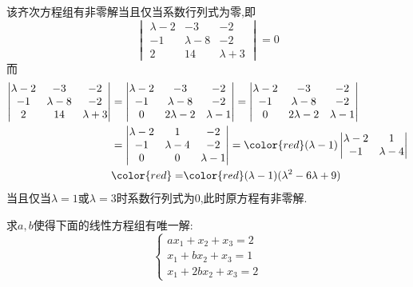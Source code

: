 \documentclass{ctexart}
\begin{document}
\begin{solution}
    该齐次方程组有非零解当且仅当系数行列式为零,即
    \[\begin{vmatrix}
        \lambda-2&-3&-2\\
        -1&\lambda-8&-2\\
        2&14&\lambda+3
    \end{vmatrix}=0\]
    而
    \[\begin{aligned}
        \begin{vmatrix}
            \lambda-2&-3&-2\\
            -1&\lambda-8&-2\\
            2&14&\lambda+3
        \end{vmatrix}
        &= \begin{vmatrix}
                \lambda-2&-3&-2\\
                -1&\lambda-8&-2\\
                0&2\lambda-2&\lambda-1
            \end{vmatrix}=
            \begin{vmatrix}
                \lambda-2&-3&-2\\
                -1&\lambda-8&-2\\
                0&2\lambda-2&\lambda-1
            \end{vmatrix} \\
        &= \begin{vmatrix}
                \lambda-2&1&-2\\
                -1&\lambda-4&-2\\
                0&0&\lambda-1
            \end{vmatrix} = 
            {\color{red}(\lambda-1)\begin{vmatrix}
                \lambda-2&1\\
                -1&\lambda-4
            \end{vmatrix}} \\
        &{\color{red}=} {\color{red}(\lambda-1)(\lambda^2-6\lambda+9)}
    \end{aligned}\]
    当且仅当{\color{red}$\lambda=1$或$\lambda=3$}时系数行列式为$0$,此时原方程有非零解.
\end{solution}
\begin{homework}[5]
    求$a,b$使得下面的线性方程组有唯一解:
    \[\left\{\begin{array}{l}
        ax_1+x_2+x_3=2\\
        x_1+bx_2+x_3=1\\
        x_1+2bx_2+x_3=2
    \end{array}\right.\]
\end{homework}
\end{document}
